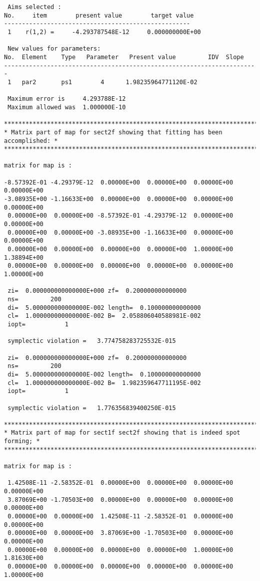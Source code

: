 \begin{footnotesize}
\begin{verbatim}
 Aims selected :
No.     item        present value        target value
----------------------------------------------------
 1    r(1,2) =     -4.293787548E-12     0.000000000E+00

 New values for parameters:
No.  Element    Type   Parameter   Present value         IDV  Slope
-----------------------------------------------------------------------
 1   par2       ps1        4      1.98235964771120E-02

 Maximum error is     4.293788E-12
 Maximum allowed was  1.000000E-10

*****************************************************************************
* Matrix part of map for sect2f showing that fitting has been accomplished: *
*****************************************************************************

matrix for map is :

-8.57392E-01 -4.29379E-12  0.00000E+00  0.00000E+00  0.00000E+00  0.00000E+00
-3.08935E+00 -1.16633E+00  0.00000E+00  0.00000E+00  0.00000E+00  0.00000E+00
 0.00000E+00  0.00000E+00 -8.57392E-01 -4.29379E-12  0.00000E+00  0.00000E+00
 0.00000E+00  0.00000E+00 -3.08935E+00 -1.16633E+00  0.00000E+00  0.00000E+00
 0.00000E+00  0.00000E+00  0.00000E+00  0.00000E+00  1.00000E+00  1.38894E+00
 0.00000E+00  0.00000E+00  0.00000E+00  0.00000E+00  0.00000E+00  1.00000E+00

 zi=  0.000000000000000E+000 zf=  0.200000000000000
 ns=         200
 di=  5.000000000000000E-002 length=  0.100000000000000
 cl=  1.000000000000000E-002 B=  2.058806040588981E-002
 iopt=           1

 symplectic violation =   3.774758283725532E-015

 zi=  0.000000000000000E+000 zf=  0.200000000000000
 ns=         200
 di=  5.000000000000000E-002 length=  0.100000000000000
 cl=  1.000000000000000E-002 B=  1.982359647711195E-002
 iopt=           1

 symplectic violation =   1.776356839400250E-015

*****************************************************************************
* Matrix part of map for sect1f sect2f showing that is indeed spot forming; *
*****************************************************************************

matrix for map is :

 1.42508E-11 -2.58352E-01  0.00000E+00  0.00000E+00  0.00000E+00  0.00000E+00
 3.87069E+00 -1.70503E+00  0.00000E+00  0.00000E+00  0.00000E+00  0.00000E+00
 0.00000E+00  0.00000E+00  1.42508E-11 -2.58352E-01  0.00000E+00  0.00000E+00
 0.00000E+00  0.00000E+00  3.87069E+00 -1.70503E+00  0.00000E+00  0.00000E+00
 0.00000E+00  0.00000E+00  0.00000E+00  0.00000E+00  1.00000E+00  1.81630E+00
 0.00000E+00  0.00000E+00  0.00000E+00  0.00000E+00  0.00000E+00  1.00000E+00


\end{verbatim}
\end{footnotesize}
